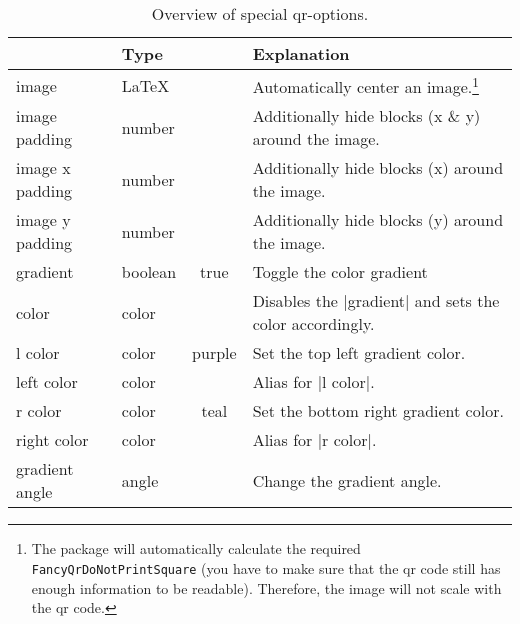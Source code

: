 \documentclass[parskip=half,english,numbers=noenddot,footnotes=nomultiple,oneside]{scrartcl}
\def\ltx#1{\lstinline/#1/}
\begin{document}
	\begin{savenotes}
	\begin{table}
		\centering\begin{tabular}{>{\ttfamily}ll>{\ttfamily}cp{.5\linewidth}}
			\toprule
			\multicolumn{1}{l}{Option} & Type & \multicolumn{1}{c}{Default} & Explanation \\
			\midrule
			image           & \LaTeX   &          & Automatically center an image.\footnote{The package will automatically calculate the required \ltx{\\FancyQrDoNotPrintSquare} (you have to make sure that the qr code still has enough information to be readable). Therefore, the image will not scale with the qr code.} \\
			image padding   & number  &          & Additionally hide blocks (x \& y) around the image.          \\
			image x padding & number  &   0      & Additionally hide blocks (x) around the image.               \\
			image y padding & number  &   0      & Additionally hide blocks (y) around the image.               \\
			gradient        & boolean &   true   & Toggle the color gradient                                    \\
			color           & color   &          & Disables the |gradient| and sets the color accordingly.      \\
			l color         & color   & purple   & Set the top left gradient color.                             \\
			left color      & color   &          & Alias for |l color|.                                         \\
			r color         & color   &  teal    & Set the bottom right gradient color.                         \\
			right color     & color   &          & Alias for |r color|.                                         \\
			gradient angle  & angle   &  135     & Change the gradient angle.                                   \\
			\bottomrule
		\end{tabular}
		\caption{Overview of special qr-options.}
		\label{tbl:extra-keys}
	\end{table}
	\end{savenotes}
\end{document}
